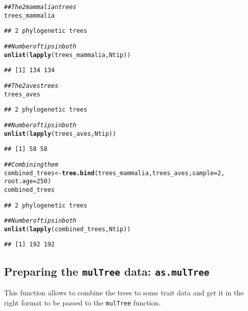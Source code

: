 \documentclass{article}\usepackage[]{graphicx}\usepackage[]{color}
\makeatletter
\newcommand{\hlnum}[1]{\textcolor[rgb]{0.686,0.059,0.569}{#1}}%
\newcommand{\hlcom}[1]{\textcolor[rgb]{0.678,0.584,0.686}{\textit{#1}}}%
\newcommand{\hlstd}[1]{\textcolor[rgb]{0.345,0.345,0.345}{#1}}%
\newcommand{\hlkwb}[1]{\textcolor[rgb]{0.69,0.353,0.396}{#1}}%
\newcommand{\hlkwc}[1]{\textcolor[rgb]{0.333,0.667,0.333}{#1}}%
\newcommand{\hlkwd}[1]{\textcolor[rgb]{0.737,0.353,0.396}{\textbf{#1}}}%
\newenvironment{kframe}{%
 \def\at@end@of@kframe{}%
 \ifinner\ifhmode%
  \def\at@end@of@kframe{\end{minipage}}%
  \begin{minipage}{\columnwidth}%
 \fi\fi%
 \def\FrameCommand##1{\hskip\@totalleftmargin \hskip-\fboxsep
 \colorbox{shadecolor}{##1}\hskip-\fboxsep
     \hskip-\linewidth \hskip-\@totalleftmargin \hskip\columnwidth}%
 \MakeFramed {\advance\hsize-\width
   \@totalleftmargin\z@ \linewidth\hsize
   \@setminipage}}%
 {\par\unskip\endMakeFramed%
 \at@end@of@kframe}
\newenvironment{knitrout}{}{} %
\makeatother
\begin{document}
\begin{knitrout}
\color{fgcolor}\begin{kframe}
\begin{alltt}
\hlcom{## The 2 mammalian trees}
\hlstd{trees_mammalia}
\end{alltt}
\begin{verbatim}
## 2 phylogenetic trees
\end{verbatim}
\begin{alltt}
\hlcom{## Number of tips in both}
\hlkwd{unlist}\hlstd{(}\hlkwd{lapply}\hlstd{(trees_mammalia, Ntip))}
\end{alltt}
\begin{verbatim}
## [1] 134 134
\end{verbatim}
\begin{alltt}
\hlcom{## The 2 aves trees}
\hlstd{trees_aves}
\end{alltt}
\begin{verbatim}
## 2 phylogenetic trees
\end{verbatim}
\begin{alltt}
\hlcom{## Number of tips in both}
\hlkwd{unlist}\hlstd{(}\hlkwd{lapply}\hlstd{(trees_aves, Ntip))}
\end{alltt}
\begin{verbatim}
## [1] 58 58
\end{verbatim}
\begin{alltt}
\hlcom{## Combining them}
\hlstd{combined_trees} \hlkwb{<-} \hlkwd{tree.bind}\hlstd{(trees_mammalia, trees_aves,} \hlkwc{sample} \hlstd{=} \hlnum{2}\hlstd{,}
    \hlkwc{root.age} \hlstd{=} \hlnum{250}\hlstd{)}
\hlstd{combined_trees}
\end{alltt}
\begin{verbatim}
## 2 phylogenetic trees
\end{verbatim}
\begin{alltt}
\hlcom{## Number of tips in both}
\hlkwd{unlist}\hlstd{(}\hlkwd{lapply}\hlstd{(combined_trees, Ntip))}
\end{alltt}
\begin{verbatim}
## [1] 192 192
\end{verbatim}
\end{kframe}
\end{knitrout}

\subsection{Preparing the \texttt{mulTree} data: \texttt{as.mulTree}}
This function allows to combine the trees to some trait data and get it in the right format to be passed to the \texttt{mulTree} function.
\end{document}
